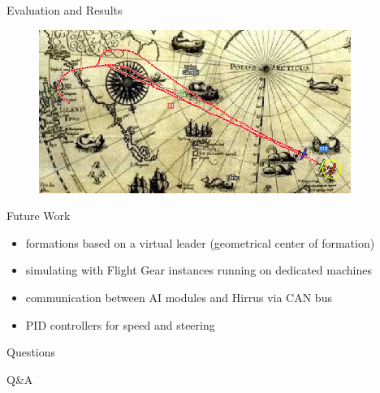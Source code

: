 \documentclass{beamer}
\begin{document}
\begin{frame}{Evaluation and Results}
\begin{center}
\begin{figure}[p]
\includegraphics[width=4in]{img/lineastern.png}
\end{figure}
\end{center}
\end{frame}

\begin{frame}{Future Work}
\begin{itemize}
\item formations based on a virtual leader (geometrical center of formation)
\item simulating with Flight Gear instances running on dedicated machines
\item communication between AI modules and Hirrus via CAN bus
\item PID controllers for speed and steering
\end{itemize}
\end{frame}

\begin{frame}{Questions}
\begin{center}
\fontsize{60}{70}\selectfont Q\&A
\end{center}
\end{frame}
\end{document}
